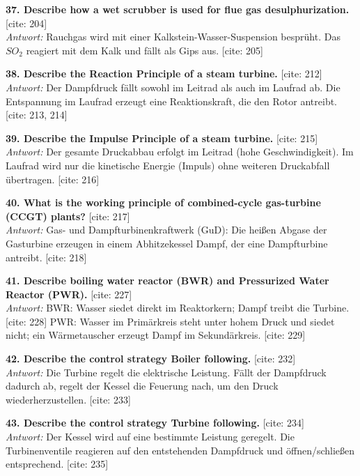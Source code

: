 \documentclass[11pt,a4paper]{article}
\begin{document}
\vspace{0.5cm}
\textbf{37. Describe how a wet scrubber is used for flue gas desulphurization.} [cite: 204]\\
\textit{Antwort:} Rauchgas wird mit einer Kalkstein-Wasser-Suspension besprüht. Das $SO_{2}$ reagiert mit dem Kalk und fällt als Gips aus. [cite: 205]

\vspace{0.5cm}
\textbf{38. Describe the Reaction Principle of a steam turbine.} [cite: 212]\\
\textit{Antwort:} Der Dampfdruck fällt sowohl im Leitrad als auch im Laufrad ab. Die Entspannung im Laufrad erzeugt eine Reaktionskraft, die den Rotor antreibt. [cite: 213, 214]

\vspace{0.5cm}
\textbf{39. Describe the Impulse Principle of a steam turbine.} [cite: 215]\\
\textit{Antwort:} Der gesamte Druckabbau erfolgt im Leitrad (hohe Geschwindigkeit). Im Laufrad wird nur die kinetische Energie (Impuls) ohne weiteren Druckabfall übertragen. [cite: 216]

\vspace{0.5cm}
\textbf{40. What is the working principle of combined-cycle gas-turbine (CCGT) plants?} [cite: 217]\\
\textit{Antwort:} Gas- und Dampfturbinenkraftwerk (GuD): Die heißen Abgase der Gasturbine erzeugen in einem Abhitzekessel Dampf, der eine Dampfturbine antreibt. [cite: 218]

\vspace{0.5cm}
\textbf{41. Describe boiling water reactor (BWR) and Pressurized Water Reactor (PWR).} [cite: 227]\\
\textit{Antwort:} BWR: Wasser siedet direkt im Reaktorkern; Dampf treibt die Turbine. [cite: 228] PWR: Wasser im Primärkreis steht unter hohem Druck und siedet nicht; ein Wärmetauscher erzeugt Dampf im Sekundärkreis. [cite: 229]

\vspace{0.5cm}
\textbf{42. Describe the control strategy Boiler following.} [cite: 232]\\
\textit{Antwort:} Die Turbine regelt die elektrische Leistung. Fällt der Dampfdruck dadurch ab, regelt der Kessel die Feuerung nach, um den Druck wiederherzustellen. [cite: 233]

\vspace{0.5cm}
\textbf{43. Describe the control strategy Turbine following.} [cite: 234]\\
\textit{Antwort:} Der Kessel wird auf eine bestimmte Leistung geregelt. Die Turbinenventile reagieren auf den entstehenden Dampfdruck und öffnen/schließen entsprechend. [cite: 235]
\end{document}
